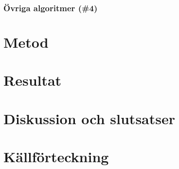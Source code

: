 \documentclass[a4, oneside]{report}
\begin{document}
\subsection{Övriga algoritmer (\#4)}

\chapter{Metod}

\chapter{Resultat}

\chapter{Diskussion och slutsatser}

\newpage
\chapter{Källförteckning}
\printbibliography
\end{document}

